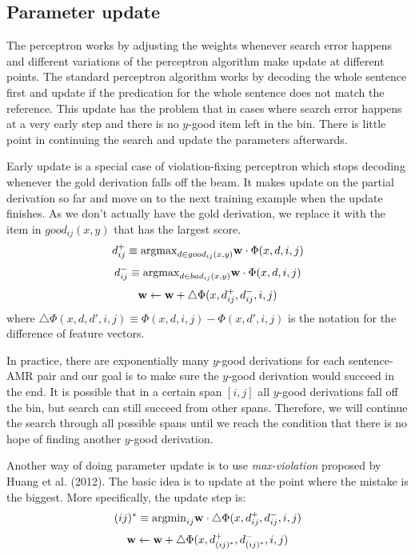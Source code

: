 \subsection{Parameter update}
The perceptron works by adjusting the weights whenever search error happens and different variations of the perceptron algorithm make update
at different points. The standard perceptron algorithm works by decoding the whole sentence first and update if the predication for the whole
sentence does not match the reference. This update has the problem that in cases where search error happens at a very early step and there is
no $y$-good item left in the bin. There is little point in continuing the search and update the parameters afterwards.


Early update is a special case of violation-fixing perceptron which stops decoding whenever the gold derivation falls off the beam. It makes update on the partial derivation so far and 
move on to the next training example when the update finishes. As we don't actually have the gold derivation, we replace it with
the item in $good_{ij}(x,y)$ that has the largest score.
$$d_{ij}^{+} \equiv {\bf \argmax}_{d\in good_{ij}(x,y)} {\bf w}\cdot \Phi(x, d, i, j)$$
$$d_{ij}^{-} \equiv {\bf \argmax}_{d\in bad_{ij}(x,y)} {\bf w}\cdot \Phi(x, d, i, j)$$
$${\bf w} \leftarrow {\bf w} + \triangle \Phi(x, d_{ij}^{+}, d_{ij}^{-}, i, j)$$
where $\triangle \Phi(x, d, d', i, j) \equiv \Phi(x, d, i, j) - \Phi(x, d', i, j)$ is the notation for the difference of feature vectors.


In practice, there are exponentially many $y$-good derivations for each sentence-AMR pair and our goal is to make sure the $y$-good derivation would succeed in the end. 
It is possible that in a certain span $[i,j]$ all $y$-good derivations fall off the bin, but search can still succeed from other spans.
Therefore, we will continue the search through all possible spans until we reach the condition that there is no hope of finding another 
$y$-good derivation.


Another way of doing parameter update is to use \textit{max-violation} proposed by Huang et al. (2012). The basic idea is to update at the
point where the mistake is the biggest. More specifically, the update step is:
$$(ij)^{*} \equiv {\argmin}_{ij} {\bf w} \cdot \triangle \Phi(x, d_{ij}^{+}, d_{ij}^{-}, i, j)$$
$${\bf w} \leftarrow {\bf w} + \triangle \Phi(x, d_{(ij)^*}^{+}, d_{(ij)^*}^{-}, i, j)$$
